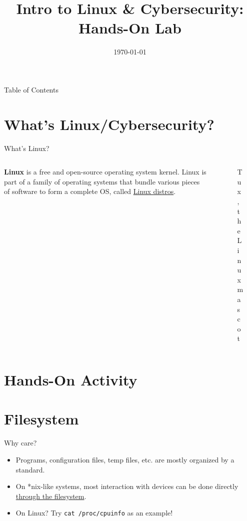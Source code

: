 \documentclass{beamer}
\title{Intro to Linux \& Cybersecurity: Hands-On Lab}
\date{\today}
\institute{Linux Users Group @ UIC\\ WiCyS @ UIC}
\begin{document}
\begin{frame}
	\titlepage
\end{frame}

\begin{frame}{Table of Contents}
	\tableofcontents[pausesections]
\end{frame}

\section{What's Linux/Cybersecurity?}
\begin{frame}{What's Linux?}
	\begin{columns}
		\begin{column}{0.5\textwidth}
			\textbf{Linux} is a free and open-source operating
			system kernel. Linux is part of a family of operating
			systems that bundle various pieces of software to form
			a complete OS, called \underline{Linux distros}.
		\end{column}
		\begin{column}{0.5\textwidth}
			\begin{figure}
				\centering
				
				\caption{Tux, the Linux mascot}
			\end{figure}
		\end{column}
	\end{columns}
\end{frame}

\section{Hands-On Activity}
\section{Filesystem}
\begin{frame}{Why care?}
	\begin{itemize}
		\item Programs, configuration files, temp files, etc. are mostly
			organized by a standard.
			\pause

		\item On *nix-like systems, most interaction with devices can be done
			directly \underline{through the filesystem}.
			\pause

		\item On Linux? Try \texttt{cat /proc/cpuinfo} as an example!
	\end{itemize}
\end{frame}
\end{document}

